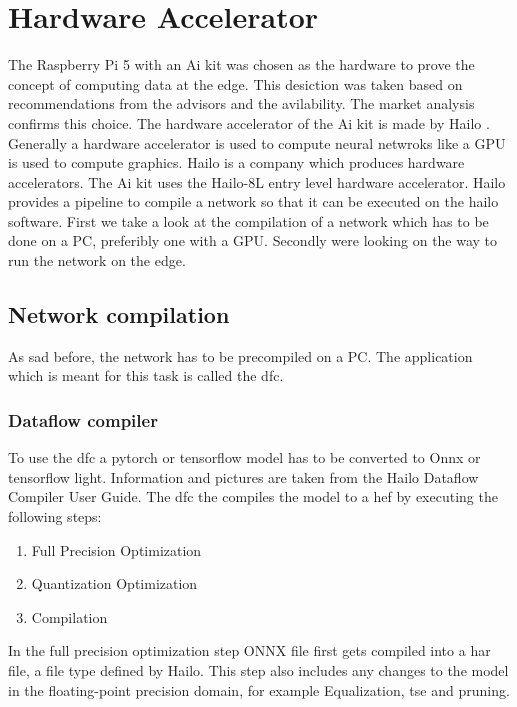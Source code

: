 \chapter{Hardware Accelerator}

The Raspberry Pi 5 with an Ai kit was chosen as the hardware to prove the concept of computing data at the edge.
This desiction was taken based on recommendations from the advisors and the avilability.
The market analysis confirms this choice.
The hardware accelerator of the Ai kit is made by Hailo \cite{hailo}.
Generally a hardware accelerator is used to compute neural netwroks like a GPU is used to compute graphics.
Hailo is a company which produces hardware accelerators.
The Ai kit uses the Hailo-8L entry level hardware accelerator.
Hailo provides a pipeline to compile a network so that it can be executed on the hailo software.
First we take a look at the compilation of a network which has to be done on a PC, preferibly one with a GPU.
Secondly were looking on the way to run the network on the edge.

\section{Network compilation}
As sad before, the network has to be precompiled on a PC.
The application which is meant for this task is called the \Acrfull{dfc}.

\subsection{Dataflow compiler
\label{section:dfc}}

To use the \acrshort{dfc} a pytorch or tensorflow model has to be converted to Onnx or tensorflow light.
Information and pictures are taken from the Hailo Dataflow Compiler User Guide\cite{hailo_dataflow_compiler}.
The \acrshort{dfc} the compiles the model to a \Acrfull{hef} by executing the following steps:

\begin{enumerate}
    \item Full Precision Optimization
    \item Quantization Optimization
    \item Compilation
\end{enumerate}
In the full precision optimization step ONNX file first gets compiled into a \acrfull{har} file, a file type defined by Hailo.
This step also includes any changes to the model in the floating-point precision domain, for example Equalization\cite{meller2019same}, \acrshort{tse}\cite{Vosco_2021_ICCV} and pruning.

